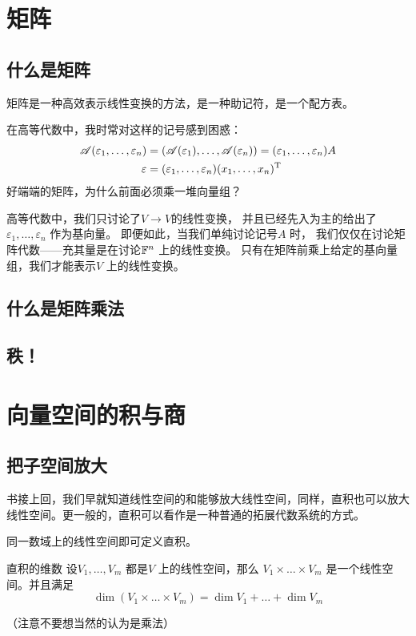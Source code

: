 \section{矩阵}
\subsection{什么是矩阵}
矩阵是一种高效表示线性变换的方法，是一种助记符，是一个配方表。

在高等代数中，我时常对这样的记号感到困惑：
\begin{align*}
    \mathscr{A}(\varepsilon_{1}, \dots, \varepsilon_{n}) &=
    (\mathscr{A}(\varepsilon_{1}), \dots,
    \mathscr{A}(\varepsilon_{n})) = (\varepsilon_{1},
    \dots, \varepsilon_{n})A\\
    \varepsilon &= (\varepsilon_{1}, \dots, \varepsilon_{n})
    (x_{1}, \dots,   x_{n})^{\mathrm{T}}
\end{align*}
好端端的矩阵，为什么前面必须乘一堆向量组？

高等代数中，我们只讨论了\(V \to V\)的线性变换，
并且已经先入为主的给出了\(\varepsilon_{1}, \dots, \varepsilon_{n}\) 作为基向量。
即便如此，当我们单纯讨论记号\(A\) 时，
我们仅仅在讨论矩阵代数——充其量是在讨论\(\mathbb{F}^{n}\) 上的线性变换。
只有在矩阵前乘上给定的基向量组，我们才能表示\(V\) 上的线性变换。

\subsection{什么是矩阵乘法}
\subsection{秩！}
\section{向量空间的积与商}
\subsection{把子空间放大}
书接上回，我们早就知道线性空间的和能够放大线性空间，同样，直积也可以放大线性空间。更一般的，直积可以看作是一种普通的拓展代数系统的方式。

同一数域上的线性空间即可定义直积。

\begin{theorem}{直积的维数}
    设\(V_1, \dots , V_{m}\) 都是\(V\) 上的线性空间，那么 \(V_{1}
    \times \dots \times V_{m}\) 是一个线性空间。并且满足\[
        \dim (V_{1} \times \dots \times V_{m}) = \dim V_{1}
        + \dots + \dim V_{m}
    \]
\end{theorem}
（注意不要想当然的认为是乘法）

